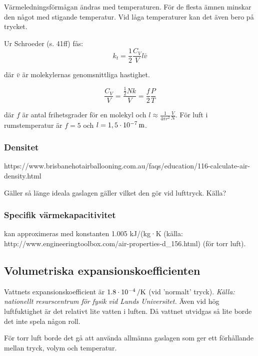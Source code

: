 Värmeledningsförmågan ändras med temperaturen. För de flesta ämnen minskar den något med stigande temperatur. Vid låga temperaturer kan det även bero på trycket.

Ur Schroeder (s. 41ff) fås:
\begin{equation}
k_t=\frac{1}{2}\frac{C_V}{V} l \bar{v}
\end{equation}

där $\bar{v}$ är molekylernas genomsnittliga hastighet.

\begin{equation}
\frac{C_V}{V}=\frac{\tfrac{1}{2}Nk}{V}=\frac{f}{2}\frac{P}{T}
\end{equation}

där $f$ är antal frihetsgrader för en molekyl och $l\approx\frac{1}{4\pi r^2}\frac{V}{N}$. För luft i rumstemperatur är $f=5$ och $l=\unit[1,5\cdot 10^{-7}]{m}$.



\subsubsection{Densitet} %
\label{sec:densitet}

https://www.brisbanehotairballooning.com.au/faqs/education/116-calculate-air-density.html

Gäller så länge ideala gaslagen gäller vilket den gör vid lufttryck. Källa?


\subsubsection{Specifik värmekapacitivitet}
kan approximeras med konstanten 1.005 kJ/(kg·K (källa: http://www.engineeringtoolbox.com/air-properties-d\_156.html) (för torr luft).


\subsection{Volumetriska expansionskoefficienten} %
Vattnets expansionskoefficient är $\unit[1.8\cdot 10^{-4}]{/K}$ (vid 'normalt' tryck). \emph{Källa: nationellt resurscentrum för fysik vid Lunds Universitet.} Även vid hög luftfuktighet är det relativt lite vatten i luften. Då vattnet utvidgas så lite borde det inte spela någon roll.

För torr luft borde det gå att använda allmänna gaslagen som ger ett förhållande mellan tryck, volym och temperatur.

